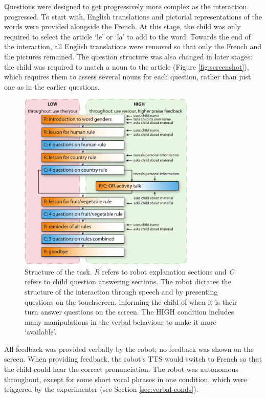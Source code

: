 Questions were designed to get progressively more complex as the interaction progressed. To start with, English translations and pictorial representations of the words were provided alongside the French. At this stage, the child was only required to select the article `le' or `la' to add to the word. Towards the end of the interaction, all English translations were removed so that only the French and the pictures remained. The question structure was also changed in later stages: the child was required to match a noun to the article (Figure \ref{fig:screenshot}), which requires them to assess several nouns for each question, rather than just one as in the earlier questions.

\begin{figure}[t!]
    \centering
    \includegraphics[width=0.75\textwidth]{images/ch9_TaskStructure_v2.pdf}
    \caption{Structure of the task. \textit{R} refers to robot explanation sections and \textit{C} refers to child question answering sections. The robot dictates the structure of the interaction through speech and by presenting questions on the touchscreen, informing the child of when it is their turn answer questions on the screen. The HIGH condition includes many manipulations in the verbal behaviour to make it more `available'.}
    \label{fig:taskstruct}
\end{figure}

All feedback was provided verbally by the robot; no feedback was shown on the screen. When providing feedback, the robot's TTS would switch to French so that the child could hear the correct pronunciation. The robot was autonomous throughout, except for some short vocal phrases in one condition, which were triggered by the experimenter (see Section \ref{sec:verbal-conds}).

